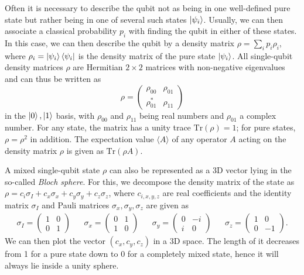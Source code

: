 \smallskip

\smallskip

Often it is necessary to describe the qubit not as being in one well-defined pure state but rather being in one of several such states $\left| \psi_i \right>$. Usually, we can then associate a classical probability $p_i$ with finding the qubit in either of these states. In this case, we can then describe the qubit by a density matrix $\rho = \sum\limits_i p_i \rho_i$, where $\rho_i=\left| \psi_{i} \right>\left< \psi_{i} \right|$ is the density matrix of the pure state $\left| \psi_i \right>$. All single-qubit density matrices $\rho$ are Hermitian $2\times 2$ matrices with non-negative eigenvalues and can thus be written as
%
\begin{equation}
\rho = \left( \begin{array}{cc} \rho_{00} & \rho_{01} \\ \rho_{01}^* & \rho_{11} \end{array} \right)
\end{equation}
%
in the ${\left| 0 \right>,\left| 1 \right>}$ basis, with $\rho_{00}$ and $\rho_{11}$ being real numbers and $\rho_{01}$ a complex number. For any state, the matrix has a unity trace $\mathrm{Tr}(\rho)=1$; for pure states, $\rho=\rho^2$ in addition. The expectation value $\langle A \rangle$ of any operator $A$ acting on the density matrix $\rho$ is given as $\mathrm{Tr}(\rho A)$.

\smallskip

A mixed single-qubit state $\rho$ can also be represented as a 3D vector lying in the so-called {\it Bloch sphere}. For this, we decompose the density matrix of the state as $\rho = c_i\sigma_I+c_x\sigma_x+c_y\sigma_y+c_z\sigma_z$, where $c_{i,x,y,z}$ are real coefficients and the identity matrix $\sigma_I$ and Pauli matrices $\sigma_x,\sigma_y,\sigma_z$ are given as
%
\begin{align}
  \sigma_I  =  \left( \begin{array}{cc} 1 & 0 \\ 0 & 1 \end{array} \right)
 & &  \sigma_x  =  \left( \begin{array}{cc} 0 & 1 \\ 1 & 0 \end{array} \right)
  & & \sigma_y  =  \left( \begin{array}{cc} 0 & -i \\ i  &  0\end{array} \right)
  & & \sigma_z  =  \left( \begin{array}{cc} 1 & 0 \\ 0 & -1 \end{array} \right).
\label{eq:pauli_operators}
\end{align}
% 
We can then plot the vector $(c_x,c_y,c_z)$ in a 3D space. The length of it decreases from 1 for a pure state down to 0 for a completely mixed state, hence it will always lie inside a unity sphere.

